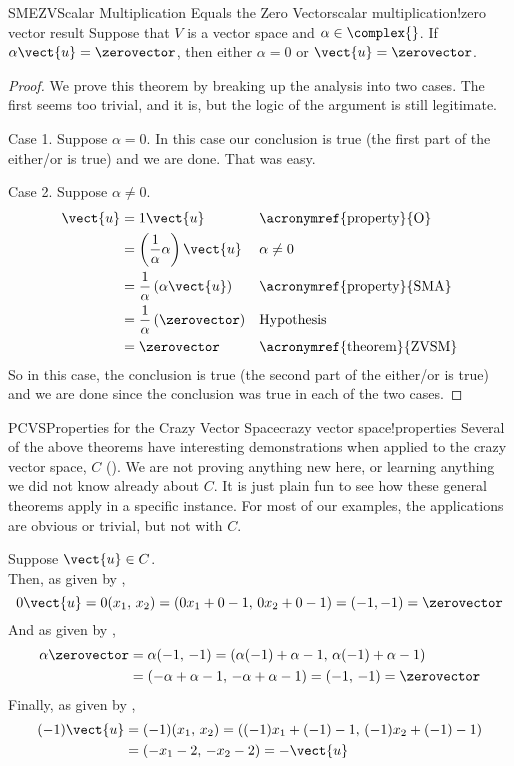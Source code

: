 %
\begin{theorem}{SMEZV}{Scalar Multiplication Equals the Zero Vector}{scalar multiplication!zero vector result}
%
Suppose that $V$ is a vector space and $\alpha\in\complex{\null}$.  If $\alpha\vect{u}=\zerovector$, then either $\alpha=0$ or $\vect{u}=\zerovector$.
%
\end{theorem}
%
\begin{proof}
We prove this theorem by breaking up the analysis into two cases.  The first seems too trivial, and it is, but the logic of the argument is still legitimate.\par
%
Case 1.  Suppose $\alpha=0$.  In this case our conclusion is true (the first part of the either/or is true) and we are done.  That was easy.\par
%
Case 2.  Suppose $\alpha\neq 0$.
\begin{align*}
\vect{u}
&=1\vect{u}
&&\text{\acronymref{property}{O}}\\
%
&=\left(\frac{1}{\alpha}\alpha\right)\vect{u}
&&\alpha\neq 0\\
%
&=\frac{1}{\alpha}\left(\alpha\vect{u}\right)
&&\text{\acronymref{property}{SMA}}\\
%
&=\frac{1}{\alpha}\left(\zerovector\right)
&&\text{Hypothesis}\\
%
&=\zerovector&&\text{\acronymref{theorem}{ZVSM}}
%
\end{align*}
%
So in this case, the conclusion is true (the second part of the either/or is true) and we are done since the conclusion was true in each of the two cases.
%
\end{proof}
%
\begin{example}{PCVS}{Properties for the Crazy Vector Space}{crazy vector space!properties}
Several of the above theorems have interesting demonstrations when applied to the crazy vector space, $C$ ().  We are not proving anything new here, or learning anything we did not know already about $C$.  It is just plain fun to see how these general theorems apply in a specific instance.  For most of our examples, the applications are obvious or trivial, but not with $C$.\par
%
Suppose $\vect{u}\in C$.\\
Then, as given by ,
%
\begin{equation*}
0\vect{u}=0(x_1,\,x_2)=(0x_1+0-1,\,0x_2+0-1)=(-1,-1)=\zerovector
\end{equation*}
%
And as given by ,
%
\begin{align*}
\alpha\zerovector
&=\alpha(-1,\,-1)=(\alpha(-1)+\alpha-1,\,\alpha(-1)+\alpha-1)\\
&=(-\alpha+\alpha-1,\,-\alpha+\alpha-1)=(-1,\,-1)=\zerovector
\end{align*}
%
Finally, as given by ,
%
\begin{align*}
(-1)\vect{u}
&=(-1)(x_1,\,x_2)=((-1)x_1+(-1)-1,\,(-1)x_2+(-1)-1)\\
&=(-x_1-2,\,-x_2-2)=-\vect{u}
\end{align*}
%
\end{example}
